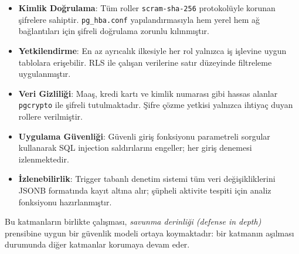\documentclass[12pt, a4paper]{report}
\begin{document}
\begin{itemize}
  \item \textbf{Kimlik Doğrulama}: Tüm roller \texttt{scram-sha-256} protokolüyle korunan şifrelere sahiptir. \texttt{pg\_hba.conf} yapılandırmasıyla hem yerel hem ağ bağlantıları için şifreli doğrulama zorunlu kılınmıştır.
  \item \textbf{Yetkilendirme}: En az ayrıcalık ilkesiyle her rol yalnızca iş işlevine uygun tablolara erişebilir. RLS ile çalışan verilerine satır düzeyinde filtreleme uygulanmıştır.
  \item \textbf{Veri Gizliliği}: Maaş, kredi kartı ve kimlik numarası gibi hassas alanlar \texttt{pgcrypto} ile şifreli tutulmaktadır. Şifre çözme yetkisi yalnızca ihtiyaç duyan rollere verilmiştir.
  \item \textbf{Uygulama Güvenliği}: Güvenli giriş fonksiyonu parametreli sorgular kullanarak SQL injection saldırılarını engeller; her giriş denemesi izlenmektedir.
  \item \textbf{İzlenebilirlik}: Trigger tabanlı denetim sistemi tüm veri değişikliklerini JSONB formatında kayıt altına alır; şüpheli aktivite tespiti için analiz fonksiyonu hazırlanmıştır.
\end{itemize}

Bu katmanların birlikte çalışması, \textit{savunma derinliği (defense in depth)} prensibine uygun bir güvenlik modeli ortaya koymaktadır: bir katmanın aşılması durumunda diğer katmanlar korumaya devam eder.
\end{document}
